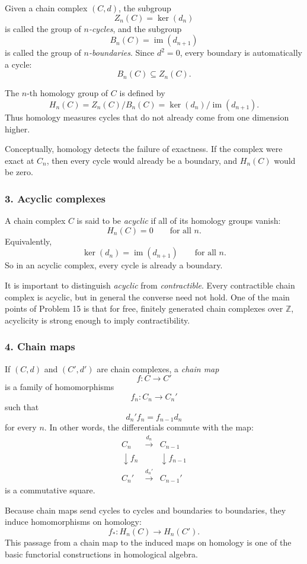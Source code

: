 \documentclass[12pt,a4paper]{article}
\theoremstyle{notespace}
\begin{document}
Given a chain complex \((C,d)\), the subgroup
\[
Z_n(C)=\ker(d_n)
\]
is called the group of \emph{\(n\)-cycles}, and the subgroup
\[
B_n(C)=\operatorname{im}(d_{n+1})
\]
is called the group of \emph{\(n\)-boundaries}. Since \(d^2=0\), every boundary is automatically a cycle:
\[
B_n(C)\subseteq Z_n(C).
\]

The \(n\)-th homology group of \(C\) is defined by
\[
H_n(C)=Z_n(C)/B_n(C)=\ker(d_n)/\operatorname{im}(d_{n+1}).
\]
Thus homology measures cycles that do not already come from one dimension higher.

Conceptually, homology detects the failure of exactness. If the complex were exact at \(C_n\), then every cycle would already be a boundary, and \(H_n(C)\) would be zero.

\subsubsection*{3. Acyclic complexes}

A chain complex \(C\) is said to be \emph{acyclic} if all of its homology groups vanish:
\[
H_n(C)=0 \qquad \text{for all }n.
\]
Equivalently,
\[
\ker(d_n)=\operatorname{im}(d_{n+1})
\qquad \text{for all }n.
\]
So in an acyclic complex, every cycle is already a boundary.

It is important to distinguish \emph{acyclic} from \emph{contractible}. Every contractible chain complex is acyclic, but in general the converse need not hold. One of the main points of Problem 15 is that for free, finitely generated chain complexes over \(\mathbb Z\), acyclicity is strong enough to imply contractibility.

\subsubsection*{4. Chain maps}

If \((C,d)\) and \((C',d')\) are chain complexes, a \emph{chain map}
\[
f:C\to C'
\]
is a family of homomorphisms
\[
f_n:C_n\to C_n'
\]
such that
\[
d_n' f_n=f_{n-1} d_n
\]
for every \(n\). In other words, the differentials commute with the map:
\[
\begin{array}{ccc}
	C_n & \xrightarrow{d_n} & C_{n-1}\\
	\downarrow f_n && \downarrow f_{n-1}\\
	C_n' & \xrightarrow{d_n'} & C_{n-1}'
\end{array}
\]
is a commutative square.

Because chain maps send cycles to cycles and boundaries to boundaries, they induce homomorphisms on homology:
\[
f_*:H_n(C)\to H_n(C').
\]
This passage from a chain map to the induced maps on homology is one of the basic functorial constructions in homological algebra.
\end{document}
